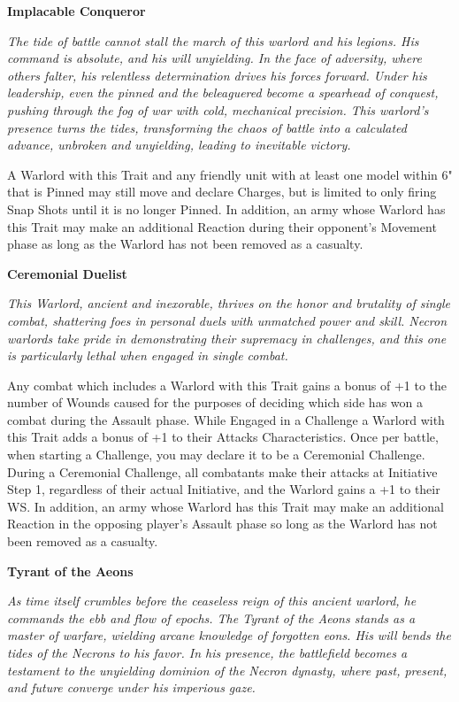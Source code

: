 \begin{multicols}{2}	
	\textbf{Implacable Conqueror}
	
	\textit{The tide of battle cannot stall the march of this warlord and his legions. His command is absolute, and his will unyielding. In the face of adversity, where others falter, his relentless determination drives his forces forward. Under his leadership, even the pinned and the beleaguered become a spearhead of conquest, pushing through the fog of war with cold, mechanical precision. This warlord's presence turns the tides, transforming the chaos of battle into a calculated advance, unbroken and unyielding, leading to inevitable victory.}
	
	A Warlord with this Trait and any friendly unit with at
	least one model within 6" that is Pinned may still move
	and declare Charges, but is limited to only firing Snap
	Shots until it is no longer Pinned. In addition, an army
	whose Warlord has this Trait may make an additional
	Reaction during their opponent’s Movement phase as long
	as the Warlord has not been removed as a casualty.
	
	\textbf{Ceremonial Duelist}
	
	\textit{This Warlord, ancient and inexorable, thrives on the honor and brutality of single combat, shattering foes in personal duels with unmatched power and skill. Necron warlords take pride in demonstrating their supremacy in challenges, and this one is particularly lethal when engaged in single combat.}
	
	Any combat which includes a Warlord with this Trait gains a bonus of +1 to the number of Wounds caused for the purposes of deciding which side has won a combat during the Assault phase. While Engaged in a Challenge a Warlord with this Trait adds a bonus of +1 to their Attacks Characteristics. Once per battle, when starting a Challenge, you may declare it to be a Ceremonial Challenge. During a Ceremonial Challenge, all combatants make their attacks at Initiative Step 1, regardless of their actual Initiative, and the Warlord gains a +1 to their WS. In addition, an army whose Warlord has this Trait may make an additional Reaction in the opposing player’s Assault phase so long as the Warlord has not been removed as a casualty.
	
	\textbf{Tyrant of the Aeons}
	
	\textit{As time itself crumbles before the ceaseless reign of this ancient warlord, he commands the ebb and flow of epochs. The Tyrant of the Aeons stands as a master of warfare, wielding arcane knowledge of forgotten eons. His will bends the tides of the Necrons to his favor. In his presence, the battlefield becomes a testament to the unyielding dominion of the Necron dynasty, where past, present, and future converge under his imperious gaze.}
	

\end{multicols}
